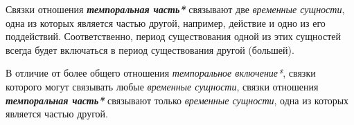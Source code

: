Связки отношения \textbf{\textit{темпоральная часть*}} связывают две \textit{временные сущности}, одна из которых является частью другой, например, действие и одно из его поддействий. Соответственно, период существования одной из этих сущностей всегда будет включаться в период существования другой (большей).
			
В отличие от более общего отношения \textit{темпоральное включение*}, связки которого могут связывать любые \textit{временные сущности}, связки отношения \textbf{\textit{темпоральная часть*}} связывают только \textit{временные сущности}, одна из которых является частью другой.

